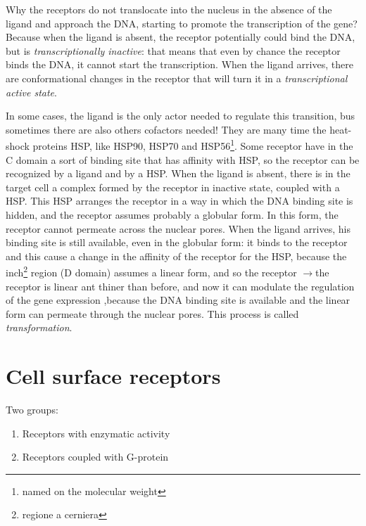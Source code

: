 \documentclass[a4paper, 12pt]{book}
\newcommand{\lfreccia}{\ensuremath{\longrightarrow}}
\begin{document}
Why the receptors do not translocate into the nucleus in the absence of the ligand and approach the DNA, starting to promote the transcription of the gene? Because when the ligand is absent, the receptor potentially could bind the DNA, but is \emph{transcriptionally inactive}: that means that even by chance the receptor binds the DNA, it cannot start the transcription. When the ligand arrives, there are conformational changes in the receptor that will turn it in a \emph{transcriptional active state}.

In some cases, the ligand is the only actor needed to regulate this transition, bus sometimes there are also others cofactors needed! They are many time the heat-shock proteins HSP, like HSP90, HSP70 and HSP56\footnote{named on the molecular weight}.  Some receptor have in the C domain a sort of binding site that has affinity with HSP, so the receptor can be recognized by a ligand and by a HSP. When the ligand is absent, there is in  the target cell a complex formed by the receptor in inactive state, coupled with a HSP. This HSP arranges the receptor in a way in which the DNA binding site is hidden, and the receptor assumes probably  a globular form. In this form, the receptor cannot permeate across the nuclear pores. When the ligand arrives, his binding site is still available, even in the globular form: it binds to the receptor and this cause a change in the affinity of the receptor for the HSP, because the inch\footnote{regione a cerniera} region (D domain) assumes a linear form, and so the receptor \lfreccia the receptor is linear ant thiner than before, and now it can modulate the regulation of the gene expression ,because the DNA binding site is available and the linear form can permeate through the nuclear pores. This process is called \emph{transformation}.


\section{Cell surface receptors}
Two groups:
\begin{enumerate}
\item{Receptors with enzymatic activity}
\item{Receptors coupled with G-protein}
\end{enumerate}
\end{document}

